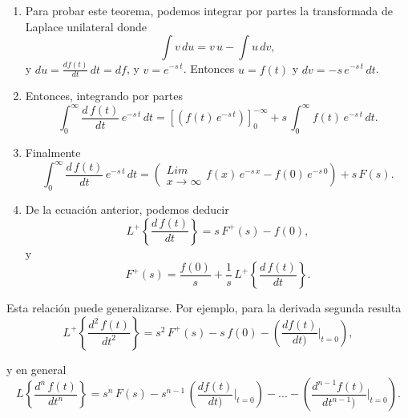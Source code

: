 \begin{enumerate}
\item Para probar este teorema, podemos integrar por partes la transformada de Laplace unilateral donde
\begin{equation}
 \int v \, du = v \, u - \int u \, dv,
\end{equation}
y $du = \frac{df(t)}{dt} \, dt = df$, y $v = e^{-s \, t}$. Entonces $u = f(t)$ y 
$dv = -s \, e^{-s \, t} \, dt$.
\item Entonces, integrando por partes
\begin{equation}
 \int_{0}^{\infty} \frac{d \, f(t)}{dt} \, e^{-s \, t} \, dt = 
\left[ \left(f(t) \, e^{-s \, t}\right) \right]_{0}^{-\infty} + 
s \, \int_{0}^{\infty} f(t) \, e^{-s \, t} \, dt.
\end{equation}

\item Finalmente
\begin{equation}
 \int_{0}^{\infty} \frac{d \, f(t)}{dt} \, e^{-s \, t} \, dt = 
\left(
 \begin{array}{c}
 Lim \\
 x \rightarrow \infty
\end{array}
f(x) \, e^{-s \, x} -
f(0) \, e^{-s \, 0} \right)
+ s \, F(s).
\end{equation}

\item De la ecuaci\'{o}n anterior, podemos deducir
\begin{equation}
L^{+} \left\{ \frac{d \, f(t)}{dt}\right\} = s \, F^{+}(s) - f(0),
\end{equation}
y
\begin{equation}
F^{+}(s) = \frac{f(0)}{s} + \frac{1}{s} \, L^{+} \left\{ \frac{d \, f(t)}{dt}\right\}.
\end{equation}

\end{enumerate}

Esta relaci\'{o}n puede generalizarse. Por ejemplo, para la derivada segunda resulta
\begin{equation}
L^{+} \left\{ \frac{d^{2} \, f(t)}{dt^{2}}\right\} = 
s^{2} \, F^{+}(s) - s \, f(0) - \left(\frac{df(t)}{dt)} |_{t=0}\right),
\end{equation}

y en general
\begin{equation}
L \left\{ \frac{d^{n} \, f(t)}{dt^{n}}\right\} = s^{n} \, F(s) - s^{n-1} \, \left(\frac{df(t)}{dt)} |_{t=0}\right) - ... - \left(\frac{d^{n-1}f(t)}{dt^{n-1})} |_{t=0}\right).
\end{equation}

